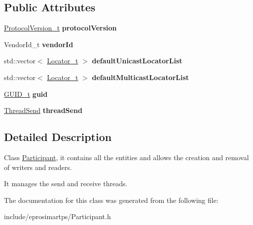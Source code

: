 \subsection*{\-Public \-Attributes}
\begin{DoxyCompactItemize}
\item 
\hypertarget{classeprosima_1_1rtps_1_1_participant_abf52ce23517b3ed5a518f547d9ad269b}{\hyperlink{structeprosima_1_1rtps_1_1_protocol_version__t}{\-Protocol\-Version\-\_\-t} {\bfseries protocol\-Version}}\label{classeprosima_1_1rtps_1_1_participant_abf52ce23517b3ed5a518f547d9ad269b}

\item 
\hypertarget{classeprosima_1_1rtps_1_1_participant_a6332615d6fe6b4022f14f79bcdc79ae4}{\-Vendor\-Id\-\_\-t {\bfseries vendor\-Id}}\label{classeprosima_1_1rtps_1_1_participant_a6332615d6fe6b4022f14f79bcdc79ae4}

\item 
\hypertarget{classeprosima_1_1rtps_1_1_participant_aa92b650c9d6febbcbf011cdf998efbcd}{std\-::vector$<$ \hyperlink{structeprosima_1_1rtps_1_1_locator__t}{\-Locator\-\_\-t} $>$ {\bfseries default\-Unicast\-Locator\-List}}\label{classeprosima_1_1rtps_1_1_participant_aa92b650c9d6febbcbf011cdf998efbcd}

\item 
\hypertarget{classeprosima_1_1rtps_1_1_participant_ac623cd2648b545f8af6ab6f66a5c0915}{std\-::vector$<$ \hyperlink{structeprosima_1_1rtps_1_1_locator__t}{\-Locator\-\_\-t} $>$ {\bfseries default\-Multicast\-Locator\-List}}\label{classeprosima_1_1rtps_1_1_participant_ac623cd2648b545f8af6ab6f66a5c0915}

\item 
\hypertarget{classeprosima_1_1rtps_1_1_participant_a6f48a5c6a59aec33f2e726d6cc246432}{\hyperlink{structeprosima_1_1rtps_1_1_g_u_i_d__t}{\-G\-U\-I\-D\-\_\-t} {\bfseries guid}}\label{classeprosima_1_1rtps_1_1_participant_a6f48a5c6a59aec33f2e726d6cc246432}

\item 
\hypertarget{classeprosima_1_1rtps_1_1_participant_a54dbe5e569c49ad60e2cdd58893b6962}{\hyperlink{classeprosima_1_1rtps_1_1_thread_send}{\-Thread\-Send} {\bfseries thread\-Send}}\label{classeprosima_1_1rtps_1_1_participant_a54dbe5e569c49ad60e2cdd58893b6962}

\end{DoxyCompactItemize}


\subsection{\-Detailed \-Description}
\-Class \hyperlink{classeprosima_1_1rtps_1_1_participant}{\-Participant}, it contains all the entities and allows the creation and removal of writers and readers. 

\-It manages the send and receive threads. 

\-The documentation for this class was generated from the following file\-:\begin{DoxyCompactItemize}
\item 
include/eprosimartps/\-Participant.\-h\end{DoxyCompactItemize}
